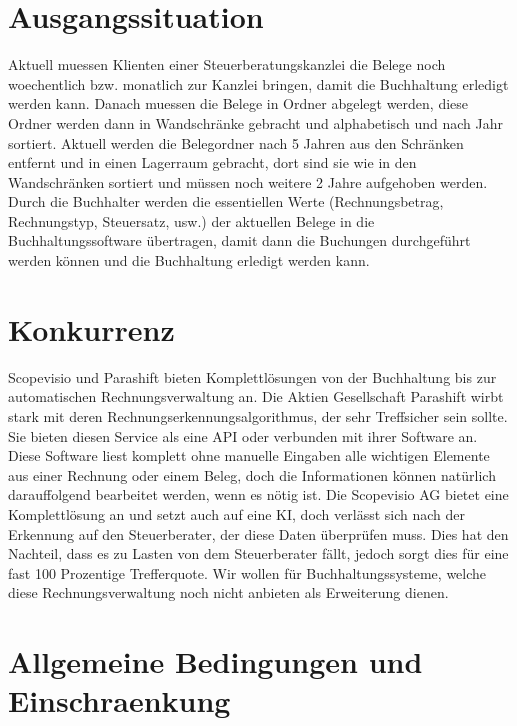\documentclass[12pt]{article}
\theoremstyle{definition}
\begin{document}
\section{Ausgangssituation}
Aktuell muessen Klienten einer Steuerberatungskanzlei die Belege noch woechentlich bzw. monatlich zur Kanzlei bringen, damit die Buchhaltung erledigt werden kann. Danach muessen die Belege in Ordner abgelegt werden, diese Ordner werden dann in Wandschränke gebracht und alphabetisch und nach Jahr sortiert. Aktuell werden die Belegordner nach 5 Jahren aus den Schränken entfernt und in einen Lagerraum gebracht, dort sind sie wie in den Wandschränken sortiert und müssen noch weitere 2 Jahre aufgehoben werden. Durch die Buchhalter werden die essentiellen Werte (Rechnungsbetrag, Rechnungstyp, Steuersatz, usw.) der aktuellen Belege in die Buchhaltungssoftware übertragen, damit dann die Buchungen durchgeführt werden können und die Buchhaltung erledigt werden kann.
\pagebreak

\section{Konkurrenz}
Scopevisio und Parashift bieten Komplettlösungen von der Buchhaltung bis zur automatischen Rechnungsverwaltung an. Die Aktien Gesellschaft Parashift wirbt stark mit deren Rechnungserkennungsalgorithmus, der sehr Treffsicher sein sollte. Sie bieten diesen Service als eine API oder verbunden mit ihrer Software an. Diese Software liest komplett ohne manuelle Eingaben alle wichtigen Elemente aus einer Rechnung oder einem Beleg, doch die Informationen können natürlich darauffolgend bearbeitet werden, wenn es nötig ist. Die Scopevisio AG bietet eine Komplettlösung an und setzt auch auf eine KI, doch verlässt sich nach der Erkennung auf den Steuerberater, der diese Daten überprüfen muss. Dies hat den Nachteil, dass es zu Lasten von dem Steuerberater fällt, jedoch sorgt dies für eine fast 100 Prozentige Trefferquote. Wir wollen für Buchhaltungssysteme, welche diese Rechnungsverwaltung noch nicht anbieten als Erweiterung dienen.
\pagebreak

\section{Allgemeine Bedingungen und Einschraenkung}
\end{document}
